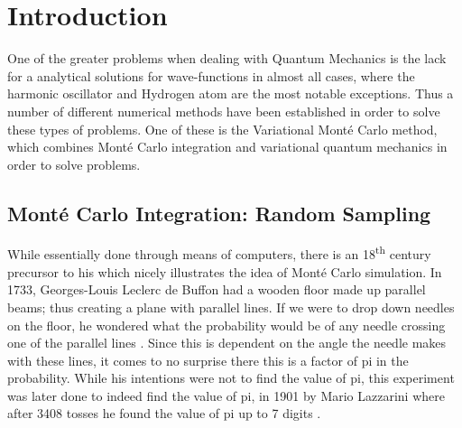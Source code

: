 

\section{Introduction}
One of the greater problems when dealing with Quantum Mechanics is the lack for a analytical solutions for wave-functions
in almost all cases, where the harmonic oscillator and Hydrogen atom are the most notable exceptions.
Thus a number of different numerical methods have been established in order to solve these types
of problems. One of these is the Variational Mont\'e Carlo method, which combines Mont\'e Carlo integration and variational
quantum mechanics in order to solve problems.


\subsection{Mont\'e Carlo Integration: Random Sampling}
\label{ch:monte}
While essentially done through means of computers, there is an 18\textsuperscript{th} century precursor to
his which nicely illustrates the idea of Mont\'e Carlo simulation. In 1733, Georges-Louis Leclerc
de Buffon had a wooden floor made up parallel beams; thus creating a plane with parallel lines.
If we were to drop down needles on the floor, he wondered what the probability would be of
any needle crossing one of the parallel lines \cite{Buffon}. Since this is dependent on the
angle the needle makes with these lines, it comes to no surprise there this is a factor of pi
in the probability. While his intentions were not to find the value of pi, this experiment
was later done to indeed find the value of pi, in 1901 by Mario Lazzarini where after 3408
tosses he found the value of pi up to 7 digits \cite{Lazzarini}.


